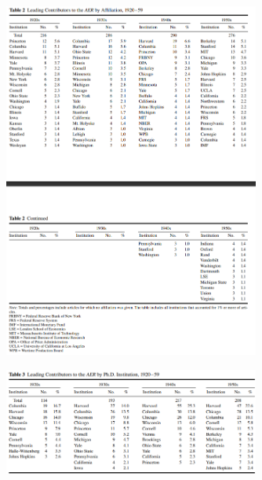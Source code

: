 \documentclass[12pt]{article}
\begin{document}
\begin{figure}[H]
    \centering
    \includegraphics[width=0.75\textwidth]{4º Período/História do Pensamento Econômico/Tradução HPE/Tradução Tópico 7.2/table 2.png}
    \end{figure}

\begin{figure}[H]
    \centering
    \includegraphics[width=0.75\textwidth]{4º Período/História do Pensamento Econômico/Tradução HPE/Tradução Tópico 7.2/table 3.png}
    \end{figure}
\end{document}
